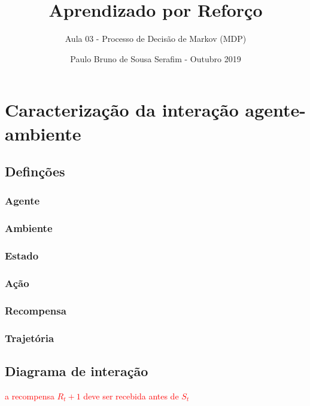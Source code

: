 \documentclass{article}
\title{Aprendizado por Reforço}
\author{Aula 03 - Processo de Decisão de Markov (MDP)}
\date{Paulo Bruno de Sousa Serafim - Outubro 2019}
\begin{document}
\maketitle

\section{Caracterização da interação agente-ambiente}

    \subsection{Definções}
        
        \subsubsection{Agente}
        \subsubsection{Ambiente}
        \subsubsection{Estado}
        \subsubsection{Ação}
        \subsubsection{Recompensa}
        \subsubsection{Trajetória}
        
    \subsection{Diagrama de interação}
    
        \textcolor{red}{a recompensa $R_t+1$ deve ser recebida antes de $S_t$}
    
\end{document}

